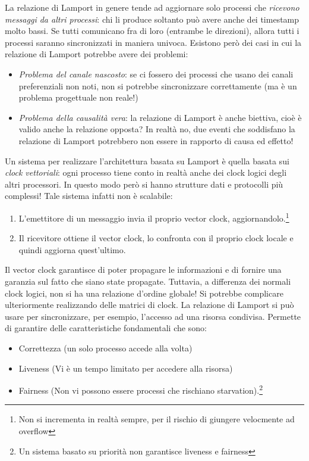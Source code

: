 La relazione di Lamport in genere tende ad aggiornare solo processi che \textit{ricevono messaggi da altri processi}:
chi li produce soltanto può avere anche dei timestamp molto bassi. Se tutti comunicano fra di loro (entrambe le
direzioni), allora tutti i processi saranno sincronizzati in maniera univoca. Esistono però dei casi in cui la relazione
di Lamport potrebbe avere dei problemi:
\begin{itemize}
 \item \textit{Problema del canale nascosto}: se ci fossero dei processi che usano dei canali preferenziali non noti,
 non si potrebbe sincronizzare correttamente (ma è un problema progettuale non reale!)
 \item \textit{Problema della causalità vera}: la relazione di Lamport è anche biettiva, cioè è valido anche la
 relazione opposta? In realtà no, due eventi che soddisfano la relazione di Lamport potrebbero non essere in rapporto
 di causa ed effetto!
\end{itemize}
Un sistema per realizzare l'architettura basata su Lamport è quella basata sui \textit{clock vettoriali}: ogni 
processo tiene conto in realtà anche dei clock logici degli altri processori. In questo modo però si hanno strutture
dati e protocolli più complessi! Tale sistema infatti non è scalabile:
\begin{enumerate}
 \item L'emettitore di un messaggio invia il proprio vector clock, aggiornandolo.\footnote{Non si incrementa in realtà
sempre, per il rischio di giungere velocmente ad overflow}
 \item Il ricevitore ottiene il vector clock, lo confronta con il proprio clock locale e quindi aggiorna quest'ultimo.
\end{enumerate}
Il vector clock garantisce di poter propagare le informazioni e di fornire una garanzia sul fatto che siano state
propagate. Tuttavia, a differenza dei normali clock logici, non si ha una relazione d'ordine globale! Si potrebbe
complicare ulteriormente realizzando delle matrici di clock.
La relazione di Lamport si può usare per sincronizzare, per esempio, l'accesso ad una risorsa condivisa. Permette di
garantire delle caratteristiche fondamentali che sono:
\begin{itemize}
 \item Correttezza (un solo processo accede alla volta)
 \item Liveness (Vi è un tempo limitato per accedere alla risorsa)
 \item Fairness (Non vi possono essere processi che rischiano starvation).\footnote{Un sistema basato su priorità non
 garantisce liveness e fairness}
\end{itemize}
